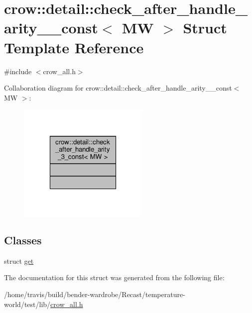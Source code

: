 \hypertarget{structcrow_1_1detail_1_1check__after__handle__arity__3__const}{\section{crow\-:\-:detail\-:\-:check\-\_\-after\-\_\-handle\-\_\-arity\-\_\-\_\-const$<$ M\-W $>$ Struct Template Reference}
\label{structcrow_1_1detail_1_1check__after__handle__arity__3__const}
}


{\ttfamily \#include $<$crow\-\_\-all.\-h$>$}



Collaboration diagram for crow\-:\-:detail\-:\-:check\-\_\-after\-\_\-handle\-\_\-arity\-\_\-\_\-const$<$ M\-W $>$\-:
\nopagebreak
\begin{figure}[H]
\begin{center}
\leavevmode
\includegraphics[width=178pt]{structcrow_1_1detail_1_1check__after__handle__arity__3__const__coll__graph}
\end{center}
\end{figure}
\subsection*{Classes}
\begin{DoxyCompactItemize}
\item 
struct \hyperlink{structcrow_1_1detail_1_1check__after__handle__arity__3__const_1_1get}{get}
\end{DoxyCompactItemize}


The documentation for this struct was generated from the following file\-:\begin{DoxyCompactItemize}
\item 
/home/travis/build/bender-\/wardrobe/\-Recast/temperature-\/world/test/lib/\hyperlink{crow__all_8h}{crow\-\_\-all.\-h}\end{DoxyCompactItemize}
